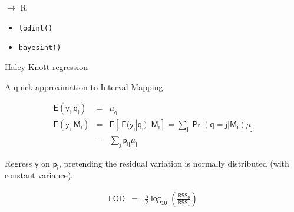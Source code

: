 \documentclass[12pt]{article}
\newcommand{\headsize}{\fontsize{35}{35} \selectfont}
\newcommand{\smallsize}{\fontsize{25}{30} \selectfont}
\newcommand{\smallersize}{\fontsize{20}{25} \selectfont}
\newcommand{\lod}{\text{LOD}}
\newcommand{\rss}{\text{RSS}}
\begin{document}
\newpage

\headsize \color{myyellow}
$\boldsymbol{\rightarrow}$ R

\vspace{3cm}

\color{mywhite} \smallsize

\hfill \begin{minipage}[t]{9.5in}
\begin{itemize}
\itemsep24pt
\item \verb|lodint()|
\item \verb|bayesint()|
\end{itemize} \end{minipage}



\newpage

\headsize \color{myyellow}
\hfill \begin{minipage}{5.75in}
\centering
Haley-Knott regression
\end{minipage}

\vspace{3cm}

\color{mywhite} \smallsize

\hspace*{0.5in}
A quick approximation to Interval Mapping.

\smallersize

\begin{eqnarray*}
\mathsf{E(y_i | q_i)} & = & \mathsf{ \mu_q } \\[24pt]
\mathsf{E(y_i | M_i)} & = & \mathsf{E[ \ E(y_i|q_i) \ | M_i]}
 =  \mathsf{\textstyle{\sum_j \Pr(q=j|M_i) \mu_j}} \\[12pt]
& = & \mathsf{\textstyle{\sum_j p_{ij} \mu_j}}
\end{eqnarray*}

\vspace{1cm}

\hfill \begin{minipage}{10in}
\setlength{\rightskip}{0pt plus 1fil} %
{\color{mypink} Regress $\mathsf{y}$ on $\mathsf{p_i}$}, pretending the residual
variation is normally distributed (with constant variance).
\end{minipage}

\begin{eqnarray*}
\mathsf{\lod} & = & \mathsf{\frac{n}{2} \log_{10} \left( \frac{\rss_0}{\rss_1} \right)}
\end{eqnarray*}
\end{document}
